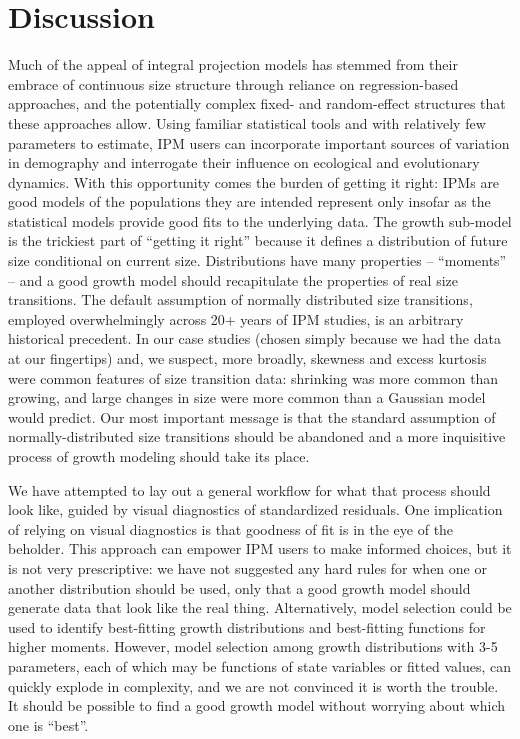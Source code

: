 \documentclass[12pt]{article}
\begin{document}
\section{Discussion}
Much of the appeal of integral projection models has stemmed from their embrace of continuous size structure through reliance on regression-based approaches, and the potentially complex fixed- and random-effect structures that these approaches allow. 
Using familiar statistical tools and with relatively few parameters to estimate, IPM users can incorporate important sources of variation in demography and interrogate their influence on ecological and evolutionary dynamics. 
With this opportunity comes the burden of getting it right: IPMs are good models of the populations they are intended represent only insofar as the statistical models provide good fits to the underlying data. 
The growth sub-model is the trickiest part of ``getting it right'' because it defines a distribution of future size conditional on current size. 
Distributions have many properties -- ``moments'' -- and a good growth model should recapitulate the properties of real size transitions. 
The default assumption of normally distributed size transitions, employed overwhelmingly across 20+ years of IPM studies, is an arbitrary historical precedent. 
In our case studies (chosen simply because we had the data at our fingertips) and, we suspect, more broadly, skewness and excess kurtosis were common features of size transition data: shrinking was more common than growing, and large changes in size were more common than a Gaussian model would predict. 
Our most important message is that the standard assumption of normally-distributed size transitions should be abandoned and a more inquisitive process of growth modeling should take its place. 

We have attempted to lay out a general workflow for what that process should look like, guided by visual diagnostics of standardized residuals. 
One implication of relying on visual diagnostics is that goodness of fit is in the eye of the beholder. 
This approach can empower IPM users to make informed choices, but it is not very prescriptive: we have not suggested any hard rules for when one or another distribution should be used, only that a good growth model should generate data that look like the real thing. 
Alternatively, model selection could be used to identify best-fitting growth distributions and best-fitting functions for higher moments. 
However, model selection among growth distributions with 3-5 parameters, each of which may be functions of state variables or fitted values, can quickly explode in complexity, and we are not convinced it is worth the trouble. 
It should be possible to find a good growth model without worrying about which one is ``best''. 
\end{document}
